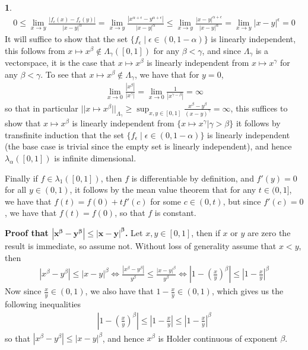 \documentclass[10.5pt]{article}
\theoremstyle{definition}
\newtheorem{pb}{}
\newcommand{\set}[1]{\{#1\}}
\newcommand{\abs}[1]{\left\vert#1\right\vert}
\newcommand{\norm}[1]{\lvert\lvert#1\rvert\rvert}
\newcommand{\tor}{\text{ or }}
\begin{document}
\begin{pb}
            \begin{align*}
                0 \leq \lim_{x \to y}\frac{\abs{f_\epsilon(x) - f_\epsilon(y)}}{\abs{x-y}^\alpha} = \lim_{x \to y}\frac{\abs{x^{\alpha + \epsilon} - y^{\alpha + \epsilon}}}{\abs{x-y}^\alpha} \leq \lim_{x \to y}\frac{\abs{x - y}^{\alpha + \epsilon}}{\abs{x-y}^\alpha} = \lim_{x \to y}\abs{x-y}^\epsilon = 0
            \end{align*}
            It will suffice to show that the set \(\set{f_\epsilon \mid \epsilon \in (0,1-\alpha)}\) is linearly independent, this follows from \(x \mapsto x^\beta \not \in \Lambda_\gamma([0,1])\) for any \(\beta < \gamma\), and since \(\Lambda_\gamma\) is a vectorspace, it is the case that \(x \mapsto x^\beta\) is linearly independent from \(x \mapsto x^\gamma\) for any \(\beta < \gamma\). To see that \(x \mapsto x^\beta \not \in \Lambda_\gamma\), we have that for \(y = 0\),
            \begin{align*}
                \lim_{x \to 0}\frac{\abs{x^\beta}}{\abs{x^\gamma}} = \lim_{x \to 0}\frac{1}{\abs{x^{\gamma - \beta}}} = \infty
            \end{align*}
            so that in particular \(\norm{x \mapsto x^\beta}_{\Lambda_\gamma} \geq \sup_{x,y \in [0,1]}\frac{x^\beta - y^\beta}{(x - y)^\gamma} = \infty\), this suffices to show that \(x \mapsto x^\beta\) is linearly independent from \(\set{x \mapsto x^\gamma \vert \gamma > \beta}\) it follows by transfinite induction that the set \(\set{f_\epsilon \mid \epsilon \in (0,1-\alpha)}\) is linearly independent (the base case is trivial since the empty set is linearly independent), and hence \(\lambda_\alpha([0,1])\) is infinite dimensional.

            Finally if \(f \in \lambda_1([0,1])\), then \(f\) is differentiable by definition, and \(f'(y) = 0\) for all \(y \in (0,1)\), it follows by the mean value theorem that for any \(t \in (0,1]\), we have that \(f(t) = f(0) + tf'(c)\) for some \(c \in (0,t)\), but since \(f'(c) = 0\), we have that \(f(t) = f(0)\), so that \(f\) is constant.

            \textbf{Proof that \(\mathbf{\abs{x^\beta - y^\beta} \leq \abs{x-y}^\beta}\).} Let \(x,y \in [0,1]\), then if \(x \tor y\) are zero the result is immediate, so assume not. Without loss of generality assume that \(x < y\), then
            \begin{align*}
                \abs{x^\beta - y^\beta} \leq \abs{x - y}^\beta \iff \frac{\abs{x^\beta - y^\beta}}{y^\beta} \leq \frac{\abs{x - y}^\beta}{y^\beta} \iff \abs{1 - \left(\frac{x}{y}\right)^\beta} \leq \abs{1 - \frac{x}{y}}^\beta
            \end{align*}
            Now since \(\frac{x}{y} \in (0,1)\), we also have that \(1 - \frac{x}{y} \in (0,1)\), which gives us the following inequalities
            \begin{align*}
                \abs{1 - \left(\frac{x}{y}\right)^\beta} \leq \abs{1 - \frac{x}{y}} \leq \abs{1 - \frac{x}{y}}^\beta
            \end{align*}
            so that \(\abs{x^\beta - y^\beta} \leq \abs{x - y}^\beta\), and hence \(x^\beta\) is Holder continuous of exponent \(\beta\).
        \end{pb}
\end{document}
